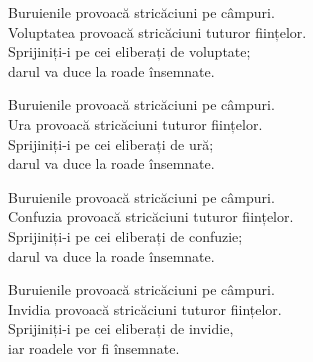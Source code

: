 Buruienile provoacă stricăciuni pe câmpuri.\\
Voluptatea provoacă stricăciuni tuturor ființelor.\\
Sprijiniți-i pe cei eliberați de voluptate;\\
darul va duce la roade însemnate.


Buruienile provoacă stricăciuni pe câmpuri.\\
Ura provoacă stricăciuni tuturor ființelor.\\
Sprijiniți-i pe cei eliberați de ură;\\
darul va duce la roade însemnate.


Buruienile provoacă stricăciuni pe câmpuri.\\
Confuzia provoacă stricăciuni tuturor ființelor.\\
Sprijiniți-i pe cei eliberați de confuzie;\\
darul va duce la roade însemnate.


Buruienile provoacă stricăciuni pe câmpuri.\\
Invidia provoacă stricăciuni tuturor ființelor.\\
Sprijiniți-i pe cei eliberați de invidie,\\
iar roadele vor fi însemnate.
